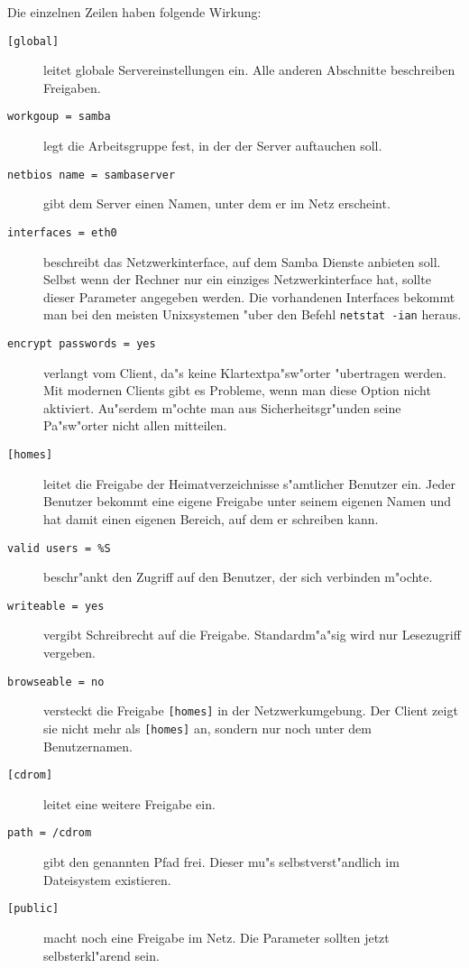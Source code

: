\documentclass{scrartcl}\usepackage{pslatex}\typearea{12}
\newcommand{\prog}{\texttt}
\newcommand{\param}{\texttt}
\newcommand{\todo}[1]{}
\begin{document}
Die einzelnen Zeilen haben folgende Wirkung:

\begin{description}
\item[\param{[global]}] leitet globale Servereinstellungen ein. Alle
  anderen Abschnitte beschreiben Freigaben.
\item[\param{workgoup = samba}] legt die Arbeitsgruppe fest, in der
  der Server auftauchen soll.
\item[\param{netbios name = sambaserver}] gibt dem Server einen Namen,
  unter dem er im Netz erscheint.
\item[\param{interfaces = eth0}] beschreibt das Netzwerkinterface, auf
  dem Samba Dienste anbieten soll. Selbst wenn der Rechner nur ein
  einziges Netzwerkinterface hat, sollte dieser Parameter angegeben
  werden. Die vorhandenen Interfaces bekommt man bei den meisten
  Unixsystemen "uber den Befehl \prog{netstat -ian} heraus.
  \todo{netstat -ian?}
\item[\param{encrypt passwords = yes}] verlangt vom Client, da"s keine
  Klartextpa"sw"orter "ubertragen werden. Mit modernen Clients gibt es
  Probleme, wenn man diese Option nicht aktiviert. Au"serdem m"ochte
  man aus Sicherheitsgr"unden seine Pa"sw"orter nicht allen mitteilen.
\item[\param{[homes]}] leitet die Freigabe der Heimatverzeichnisse
  s"amtlicher Benutzer ein. Jeder Benutzer bekommt eine eigene
  Freigabe unter seinem eigenen Namen und hat damit einen eigenen
  Bereich, auf dem er schreiben kann.
\item[\param{valid users = \%S}] beschr"ankt den Zugriff auf den
  Benutzer, der sich verbinden m"ochte.
\item[\param{writeable = yes}] vergibt Schreibrecht auf die Freigabe.
  Standardm"a"sig wird nur Lesezugriff vergeben.
\item[\param{browseable = no}] versteckt die Freigabe \param{[homes]}
  in der Netzwerkumgebung. Der Client zeigt sie nicht mehr als
  \param{[homes]} an, sondern nur noch unter dem Benutzernamen.
\item[\param{[cdrom]}] leitet eine weitere Freigabe ein.
\item[\param{path = /cdrom}] gibt den genannten Pfad frei. Dieser mu"s
  selbstverst"andlich im Dateisystem existieren.
\item[\param{[public]}] macht noch eine Freigabe im Netz. Die
  Parameter sollten jetzt selbsterkl"arend sein.
\end{description}
\end{document}
